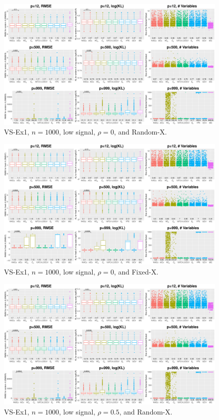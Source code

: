 \clearpage
\begin{figure}[!ht]
\centering
\includegraphics[width=\textwidth]{figures/supplement/randomx_VS-Ex1_n1000_lsnr_rho0.eps}
\caption{VS-Ex1, $n=1000$, low signal, $\rho=0$, and Random-X.}
\end{figure}
\begin{figure}[!ht]
\centering
\includegraphics[width=\textwidth]{figures/supplement/fixedx_VS-Ex1_n1000_lsnr_rho0.eps}
\caption{VS-Ex1, $n=1000$, low signal, $\rho=0$, and Fixed-X.}
\end{figure}
\clearpage
\begin{figure}[!ht]
\centering
\includegraphics[width=\textwidth]{figures/supplement/randomx_VS-Ex1_n1000_lsnr_rho05.eps}
\caption{VS-Ex1, $n=1000$, low signal, $\rho=0.5$, and Random-X.}
\end{figure}
